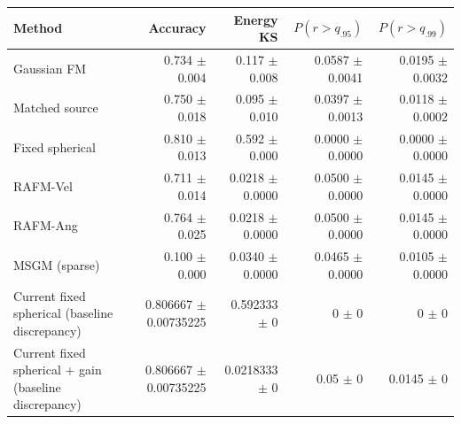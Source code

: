 \begin{tabular}{lrrrr}
\hline
Method & Accuracy & Energy KS & $P(r>q_{.95})$ & $P(r>q_{.99})$ \\
\hline
Gaussian FM & 0.734 $\pm$ 0.004 & 0.117 $\pm$ 0.008 & 0.0587 $\pm$ 0.0041 & 0.0195 $\pm$ 0.0032 \\
Matched source & 0.750 $\pm$ 0.018 & 0.095 $\pm$ 0.010 & 0.0397 $\pm$ 0.0013 & 0.0118 $\pm$ 0.0002 \\
Fixed spherical & 0.810 $\pm$ 0.013 & 0.592 $\pm$ 0.000 & 0.0000 $\pm$ 0.0000 & 0.0000 $\pm$ 0.0000 \\
RAFM-Vel & 0.711 $\pm$ 0.014 & 0.0218 $\pm$ 0.0000 & 0.0500 $\pm$ 0.0000 & 0.0145 $\pm$ 0.0000 \\
RAFM-Ang & 0.764 $\pm$ 0.025 & 0.0218 $\pm$ 0.0000 & 0.0500 $\pm$ 0.0000 & 0.0145 $\pm$ 0.0000 \\
MSGM (sparse) & 0.100 $\pm$ 0.000 & 0.0340 $\pm$ 0.0000 & 0.0465 $\pm$ 0.0000 & 0.0105 $\pm$ 0.0000 \\
\hline
Current fixed spherical (baseline discrepancy) & 0.806667 $\pm$ 0.00735225 & 0.592333 $\pm$ 0 & 0 $\pm$ 0 & 0 $\pm$ 0 \\
Current fixed spherical + gain (baseline discrepancy) & 0.806667 $\pm$ 0.00735225 & 0.0218333 $\pm$ 0 & 0.05 $\pm$ 0 & 0.0145 $\pm$ 0 \\
\hline
\end{tabular}
